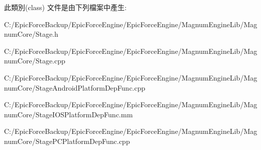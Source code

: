 此類別(class) 文件是由下列檔案中產生\+:\begin{DoxyCompactItemize}
\item 
C\+:/\+Epic\+Force\+Backup/\+Epic\+Force\+Engine/\+Epic\+Force\+Engine/\+Magnum\+Engine\+Lib/\+Magnum\+Core/Stage.\+h\item 
C\+:/\+Epic\+Force\+Backup/\+Epic\+Force\+Engine/\+Epic\+Force\+Engine/\+Magnum\+Engine\+Lib/\+Magnum\+Core/Stage.\+cpp\item 
C\+:/\+Epic\+Force\+Backup/\+Epic\+Force\+Engine/\+Epic\+Force\+Engine/\+Magnum\+Engine\+Lib/\+Magnum\+Core/Stage\+Android\+Platform\+Dep\+Func.\+cpp\item 
C\+:/\+Epic\+Force\+Backup/\+Epic\+Force\+Engine/\+Epic\+Force\+Engine/\+Magnum\+Engine\+Lib/\+Magnum\+Core/Stage\+I\+O\+S\+Platform\+Dep\+Func.\+mm\item 
C\+:/\+Epic\+Force\+Backup/\+Epic\+Force\+Engine/\+Epic\+Force\+Engine/\+Magnum\+Engine\+Lib/\+Magnum\+Core/Stage\+P\+C\+Platform\+Dep\+Func.\+cpp\end{DoxyCompactItemize}
